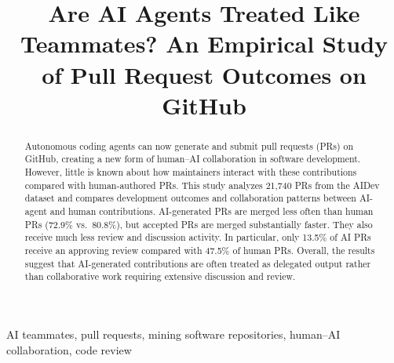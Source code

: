 \documentclass[conference]{IEEEtran}
\begin{document}
\title{Are AI Agents Treated Like Teammates? An Empirical Study of Pull Request Outcomes on GitHub}

\author{
\and
{}
\and
{}
\and
{}
}

\maketitle

\begin{abstract} 
Autonomous coding agents can now generate and submit pull requests (PRs) on GitHub, creating a new form of human--AI collaboration in software development. However, little is known about how maintainers interact with these contributions compared with human-authored PRs. This study analyzes 21,740 PRs from the AIDev dataset and compares development outcomes and collaboration patterns between AI-agent and human contributions. AI-generated PRs are merged less often than human PRs (72.9\% vs.\ 80.8\%), but accepted PRs are merged substantially faster. They also receive much less review and discussion activity. In particular, only 13.5\% of AI PRs receive an approving review compared with 47.5\% of human PRs. Overall, the results suggest that AI-generated contributions are often treated as delegated output rather than collaborative work requiring extensive discussion and review. 
\end{abstract}

\begin{IEEEkeywords}
AI teammates, pull requests, mining software repositories, human--AI collaboration, code review
\end{IEEEkeywords}
\end{document}
